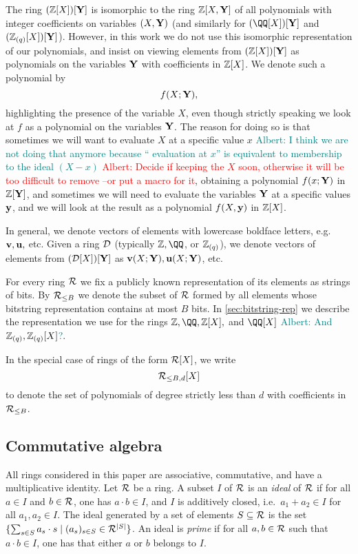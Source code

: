 \documentclass[11pt,letterpaper,usenames,dvipsnames]{article}
\newcommand{\albert}[1]{\textcolor{teal}{Albert: {#1}}}
\newcommand{\alberturgent}[1]{\textcolor{red}{Albert: {#1}}}
\begin{document}
The ring $(\mathbb{Z}[X])[\mathbf{Y}]$ is isomorphic to the ring $\mathbb{Z}[X, \mathbf{Y}]$ of all polynomials with integer coefficients on variables $(X,\mathbf{Y})$  (and similarly for $(\QQ[X])[\YY]$ and $(\mathbb{Z}_{(q)}[X])[\mathbf{Y}]$). However, in this work we do not use this isomorphic representation of our polynomials, and insist on viewing elements from $(\mathbb{Z}[X])[\mathbf{Y}]$ as polynomials on the variables $\mathbf{Y}$ with coefficients in $\mathbb{Z}[X]$. We denote such a polynomial by $$f(X;\mathbf{Y}),$$
highlighting the presence of the variable $X$, even though strictly speaking we look at $f$ as a polynomial on the variables $\mathbf{Y}$. The reason for doing so is that sometimes we will want to evaluate $X$ at a specific value $x$ \albert{I think we are not doing that anymore because `` evaluation at $x$'' is equivalent to membership to the ideal $(X-x)$} \alberturgent{Decide if keeping the $X$ soon, otherwise it will be too difficult to remove --or put a macro for it}, obtaining a polynomial $f(x;\mathbf{Y})$ in $\mathbb{Z}[\mathbf{Y}]$, and sometimes we will need to evaluate the variables $\mathbf{Y}$ at a specific values $\mathbf{y}$, and we will look at the result as  a polynomial $f(X,\mathbf{y})$ in $\mathbb{Z}[X]$. 

In general, we denote vectors of elements with lowercase boldface letters, e.g.\ $\mathbf{v},\mathbf{u},$ etc. Given a ring $\mathcal{D}$ (typically $\ZZ, \QQ$, or $\mathbb{Z}_{(q)}$), we denote vectors of elements from $(\mathcal{D}[X])[\mathbf{Y}]$ as $\mathbf{v}(X;\mathbf{Y}), \mathbf{u}(X;\mathbf{Y})$, etc.


For every ring $\mathcal{R}$  we fix a publicly known representation of its elements as strings of bits. By $\mathcal{R}_{\leq B}$ we denote the subset of $\mathcal{R}$ formed by all elements whose bitstring representation contains at most $B$ bits. In \cref{sec:bitstring-rep} we describe the representation we use for the rings $\ZZ,\QQ, \ZZ[X],$ and $\QQ[X]$ \albert{And $\mathbb{Z}_{(q)},\mathbb{Z}_{(q)}[X]$?}.

In the special case of rings of the form $\mathcal{R}[X]$, we write $$\mathcal{R}_{\leq B, d}[X]$$ to denote the set of polynomials of degree strictly less than $d$ with coefficients in $\mathcal{R}_{\leq B}$.


\subsection{Commutative algebra}
All rings considered in this paper are associative, commutative, and have a multiplicative identity. Let $\mathcal{R}$ be a ring. A subset $I$ of $\mathcal{R}$ is an \emph{ideal} of $\mathcal{R}$ if for all $a\in I$ and $b\in \mathcal{R}$, one has $a\cdot b \in I$, and $I$ is additively closed, i.e.\ $a_1 + a_2 \in I$ for all $a_1, a_2\in I$. The ideal generated by a set of elements $S\subseteq \mathcal{R}$ is the set $\{\sum_{s\in S} a_s \cdot s \mid (a_s)_{s\in S}\in \mathcal{R}^{|S|}\}$. An ideal is \emph{prime} if for all $a,b\in \mathcal{R}$ such that $a\cdot b \in I$, one has that either $a$ or $b$ belongs to $I$. 
\end{document}
